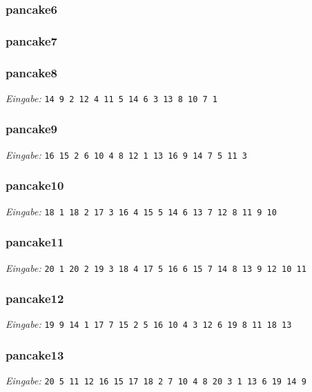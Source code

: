 \documentclass[a4paper, 10pt, ngerman]{article}
\begin{document}
\subsubsection{pancake6}


\subsubsection{pancake7}


\subsubsection{pancake8}
\scriptsize \emph{Eingabe:} \verb|14 9 2 12 4 11 5 14 6 3 13 8 10 7 1|
\normalsize


\subsubsection{pancake9}
\scriptsize \emph{Eingabe:} \verb|16 15 2 6 10 4 8 12 1 13 16 9 14 7 5 11 3|
\normalsize


\subsubsection{pancake10}
\scriptsize \emph{Eingabe: }\verb|18 1 18 2 17 3 16 4 15 5 14 6 13 7 12 8 11 9 10|
\normalsize


\subsubsection{pancake11}
\scriptsize \emph{Eingabe: }\verb|20 1 20 2 19 3 18 4 17 5 16 6 15 7 14 8 13 9 12 10 11|
\normalsize


\subsubsection{pancake12}
\scriptsize \emph{Eingabe: }\verb|19 9 14 1 17 7 15 2 5 16 10 4 3 12 6 19 8 11 18 13|
\normalsize


\subsubsection{pancake13}
\scriptsize \emph{Eingabe: }\verb|20 5 11 12 16 15 17 18 2 7 10 4 8 20 3 1 13 6 19 14 9|
\normalsize

\end{document}
